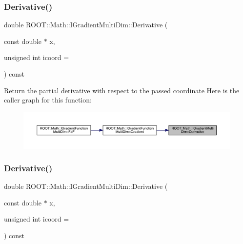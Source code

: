 \subsubsection{\texorpdfstring{Derivative()}{Derivative()}\hspace{0.1cm}{\footnotesize\ttfamily [1/3]}}
{\footnotesize\ttfamily double R\+O\+O\+T\+::\+Math\+::\+I\+Gradient\+Multi\+Dim\+::\+Derivative (\begin{DoxyParamCaption}\item[{const double $\ast$}]{x,  }\item[{unsigned int}]{icoord = {} }\end{DoxyParamCaption}) const\hspace{0.3cm}{\ttfamily [inline]}}

Return the partial derivative with respect to the passed coordinate Here is the caller graph for this function\+:
\nopagebreak
\begin{figure}[H]
\begin{center}
\leavevmode
\includegraphics[width=350pt]{d1/d71/classROOT_1_1Math_1_1IGradientMultiDim_ae131d6cc942c8fcf90a3b575335b30a7_icgraph}
\end{center}
\end{figure}
\mbox{\label{classROOT_1_1Math_1_1IGradientMultiDim_ae131d6cc942c8fcf90a3b575335b30a7}} 
\subsubsection{\texorpdfstring{Derivative()}{Derivative()}\hspace{0.1cm}{\footnotesize\ttfamily [2/3]}}
{\footnotesize\ttfamily double R\+O\+O\+T\+::\+Math\+::\+I\+Gradient\+Multi\+Dim\+::\+Derivative (\begin{DoxyParamCaption}\item[{const double $\ast$}]{x,  }\item[{unsigned int}]{icoord = {} }\end{DoxyParamCaption}) const\hspace{0.3cm}{\ttfamily [inline]}}

